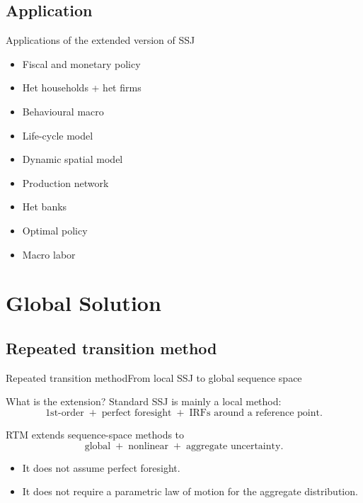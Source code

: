 \documentclass[aspectratio=169]{beamer}
\begin{document}
\subsection{Application}

\begin{frame}{Applications of the extended version of SSJ}
    \begin{itemize}
        \item Fiscal and monetary policy \cite{auclert2025fiscal,auclert2024intertemporal}
        \item Het households + het firms \cite{winberry2025new}
        \item Behavioural macro \cite{angeletos2025rank,auclert2020micro}
        \item Life-cycle model \cite{bardoczy2025sequence,bardoczy2024hank}
        \item Dynamic spatial model \cite{donald2025optimal,fan2023learning}
        \item Production network \cite{schaab2023monetary}
        \item Het banks \cite{bellifemine2022hbank}
        \item Optimal policy \cite{auclert2024optimal,mckay2022optimal}
        \item Macro labor \cite{guerreiro2024workers,kekre2023unemployment}
    \end{itemize}
\end{frame}


\section{Global Solution}

\subsection{Repeated transition method}

\begin{frame}{Repeated transition method}{From local SSJ to global sequence space}
\small

\begin{block}{What is the extension?}
Standard SSJ is mainly a \alert{local} method:
\[
\text{1st-order} \;+\; \text{perfect foresight} \;+\; \text{IRFs around a reference point}.
\]

RTM extends sequence-space methods to
\[
\text{global} \;+\; \text{nonlinear} \;+\; \text{aggregate uncertainty}.
\]
\end{block}

\begin{itemize}
    \item It does \alert{not} assume perfect foresight.
    \item It does \alert{not} require a parametric law of motion for the aggregate distribution.
\end{itemize}

\end{frame}
\end{document}
